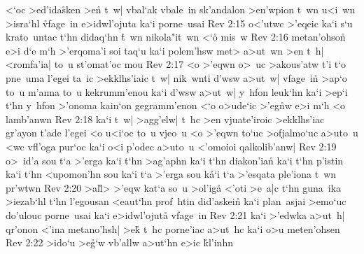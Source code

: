 <`oc
>ed'ida\r{s}ken
>en\r{}
t~w|
vbal`ak
vbale~in
sk'andalon
>en'wpion
t~wn
u<i~wn
>isra`hl
\r{vf}age~in
e>idwl'ojuta
ka`i
porne~usai\bibvsend
\vs Rev 2:15
o<'utwc
>'eqeic
ka`i
s`u
krato~untac
t`hn
didaq`hn
\r{t}~wn
nikola"it~wn
<`o\r{}
mis~w\bibvsend
\vs Rev 2:16
metan'ohso\r{n}
e>i
d`e
m`h
>'erqoma'i
soi
taq`u
ka`i
polem'hsw
met>
a>ut~wn
>en
t~h|
<romfa'ia|
to~u
st'omat'oc
mou\bibvsend
\vs Rev 2:17
<o
>'eqwn
o>~uc
>akous'atw
t'i
t`o
pne~uma
l'egei
ta~ic
>ekklhs'iaic
t~w|
nik~wnti
d'wsw
a>ut~w|
vfage~in\r{}
>ap`o
to~u
m'anna
to~u
kekrumm'enou
ka`i
d'wsw
a>ut~w|
y~hfon
leuk`hn
ka`i
>ep`i
t`hn
y~hfon
>'onoma
kain`on
gegramm'enon
<`o
o>ude`ic
>'eg\r{n}w
e>i
m`h
<o
lamb'anwn\bibvsend
\vs Rev 2:18
ka`i
t~w|
>agg'elw|
t~hc
>en
vjuate'iroic
>ekklhs'iac
gr'ayon
t'ade
l'egei
<o
u<i`oc
to~u
vjeo~u
<o
>'eqwn
to`uc
>ofjalmo`uc
a>uto~u
<wc
vfl'oga
pur`oc
ka`i
o<i
p'odec
a>uto~u
<'omoioi
qalkolib'anw|\bibvsend
\vs Rev 2:19
o>~id'a
sou
t`a
>'erga
ka`i
t`hn
>ag'aphn
ka`i
t`hn
diakon'ian\r{}
ka`i
t`hn
p'istin
ka`i
t`hn
<upomon'hn
sou
ka`i
t`a
>'erga
sou
k\r{a}`i
t`a
>'esqata
ple'iona
t~wn
pr'wtwn\bibvsend
\vs Rev 2:20
>al\r{l}>
>'eqw
kat`a
so~u
>ol'iga\r{}
<'oti
>e~a|c
t`hn
guna~ika
>iezab`hl
t`hn
l'egousan
<eaut`hn
prof~htin
did'askein\r{}
ka`i
plan~asjai
>emo`uc
do'ulouc
porne~usai
ka`i
e>idwl'ojuta\r{}
vfage~in\bibvsend
\vs Rev 2:21
ka`i
>'edwka
a>ut~h|
qr'onon
<'ina
metano'hsh|
>ek\r{}
t~hc
porne'iac
a>ut~hc
ka`i
o>u
meten'ohsen\bibvsend
\vs Rev 2:22
>ido`u
>e\r{g}`w
vb'allw
a>ut`hn
e>ic
\r{k}l'inhn
